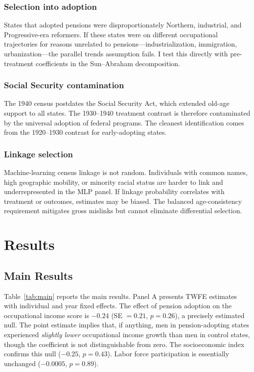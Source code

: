 \documentclass[12pt]{article}
\begin{document}
\subsubsection*{Selection into adoption} States that adopted pensions were disproportionately Northern, industrial, and Progressive-era reformers. If these states were on different occupational trajectories for reasons unrelated to pensions---industrialization, immigration, urbanization---the parallel trends assumption fails. I test this directly with pre-treatment coefficients in the Sun--Abraham decomposition.

\subsubsection*{Social Security contamination} The 1940 census postdates the Social Security Act, which extended old-age support to all states. The 1930--1940 treatment contrast is therefore contaminated by the universal adoption of federal programs. The cleanest identification comes from the 1920--1930 contrast for early-adopting states.

\subsubsection*{Linkage selection} Machine-learning census linkage is not random. Individuals with common names, high geographic mobility, or minority racial status are harder to link and underrepresented in the MLP panel. If linkage probability correlates with treatment or outcomes, estimates may be biased. The balanced age-consistency requirement mitigates gross mislinks but cannot eliminate differential selection.

\section{Results}

\subsection{Main Results}



Table~\ref{tab:main} reports the main results. Panel A presents TWFE estimates with individual and year fixed effects. The effect of pension adoption on the occupational income score is $-0.24$ (SE $= 0.21$, $p = 0.26$), a precisely estimated null. The point estimate implies that, if anything, men in pension-adopting states experienced \textit{slightly lower} occupational income growth than men in control states, though the coefficient is not distinguishable from zero. The socioeconomic index confirms this null ($-0.25$, $p = 0.43$). Labor force participation is essentially unchanged ($-0.0005$, $p = 0.89$).
\end{document}
